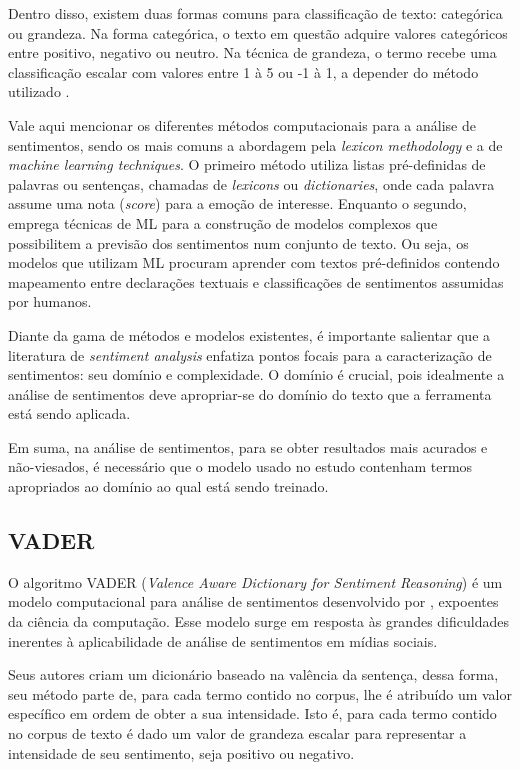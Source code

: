 Dentro disso, existem duas formas comuns para classificação de texto: categórica ou grandeza. Na forma categórica, o texto em questão adquire valores categóricos entre positivo, negativo ou neutro. Na técnica de grandeza, o termo recebe uma classificação escalar com valores entre 1 à 5 ou -1 à 1, a depender do método utilizado \cite{shap-sud}.

Vale aqui mencionar os diferentes métodos computacionais para a análise de sentimentos, sendo os mais comuns a abordagem pela \textit{lexicon methodology} e a de \textit{machine learning techniques}. O primeiro método utiliza listas pré-definidas de palavras ou sentenças, chamadas de \textit{lexicons} ou \textit{dictionaries}, onde cada palavra assume uma nota (\textit{score}) para a emoção de interesse. Enquanto o segundo, emprega técnicas de ML para a construção de modelos complexos que possibilitem a previsão dos sentimentos num conjunto de texto. Ou seja, os modelos que utilizam ML procuram aprender com textos pré-definidos contendo mapeamento entre declarações textuais e classificações de sentimentos assumidas por humanos. 

Diante da gama de métodos e modelos existentes, é importante salientar que a literatura de \textit{sentiment analysis} enfatiza pontos focais para a caracterização de sentimentos: seu domínio e complexidade. O domínio é crucial, pois idealmente a análise de sentimentos deve apropriar-se do domínio do texto que a ferramenta está sendo aplicada. 

Em suma, na análise de sentimentos, para se obter resultados mais acurados e não-viesados, é necessário que o modelo usado no estudo contenham termos apropriados ao domínio ao qual está sendo treinado.

\subsection{VADER}

O algoritmo VADER (\textit{Valence Aware Dictionary for Sentiment Reasoning}) é um modelo computacional para análise de sentimentos desenvolvido por , expoentes da ciência da computação. Esse modelo surge em resposta às grandes dificuldades inerentes à aplicabilidade de análise de sentimentos em mídias sociais.

Seus autores criam um dicionário baseado na valência da sentença, dessa forma, seu método parte de, para cada termo contido no corpus, lhe é atribuído um valor específico em ordem de obter a sua intensidade. Isto é, para cada termo contido no corpus de texto é dado um valor de grandeza escalar para representar a intensidade de seu sentimento, seja positivo ou negativo.


